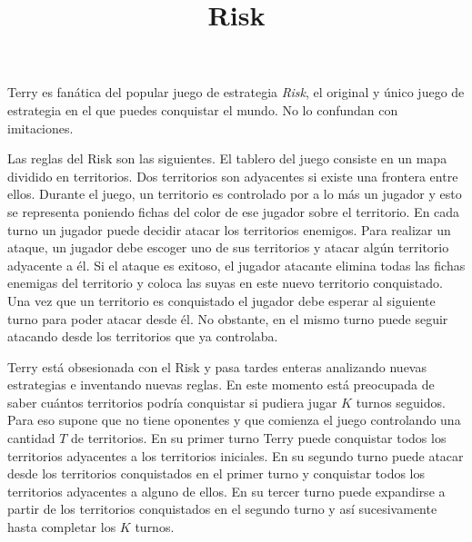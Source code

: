 \documentclass{oci}
\title{Risk}
\begin{document}
\begin{problemDescription}
%

  Terry es fanática del popular juego de estrategia \emph{Risk}, el original 
  y único juego de estrategia en el que puedes conquistar el mundo. No lo confundan con imitaciones.

  Las reglas del Risk son las siguientes.
  El tablero del juego consiste en un mapa dividido en territorios.
  Dos territorios son adyacentes si existe una frontera entre ellos. 
  Durante el juego, un territorio es controlado por a lo más un jugador %
  y esto se representa poniendo %
  fichas del color de ese jugador sobre el territorio. 
  En cada turno un jugador puede decidir atacar los territorios enemigos.
  Para realizar un ataque, un jugador debe escoger uno de sus territorios y
  atacar algún territorio adyacente a él.
  Si el ataque es exitoso, el jugador atacante elimina todas las fichas enemigas
  del territorio y coloca las suyas en este nuevo territorio conquistado.
  Una vez que un territorio es conquistado el jugador debe esperar al siguiente
  turno para poder atacar desde él.
  No obstante, en el mismo turno puede seguir atacando desde los territorios que
  ya controlaba.

  Terry está obsesionada con el Risk y pasa tardes enteras analizando
  nuevas estrategias e inventando nuevas reglas.
  En este momento está preocupada de saber cuántos territorios podría
  conquistar si pudiera jugar $K$ turnos seguidos.
  Para eso supone que no tiene oponentes y que comienza el juego controlando una
  cantidad $T$ de territorios.
  En su primer turno Terry puede conquistar todos los territorios adyacentes a
  los territorios iniciales.
  En su segundo turno puede atacar desde los territorios conquistados en
  el primer turno y conquistar todos los territorios adyacentes a alguno de
  ellos.
  En su tercer turno puede expandirse a partir de los territorios
  conquistados en el segundo turno y así sucesivamente hasta completar los $K$
  turnos.
  

\end{problemDescription}
\end{document}
